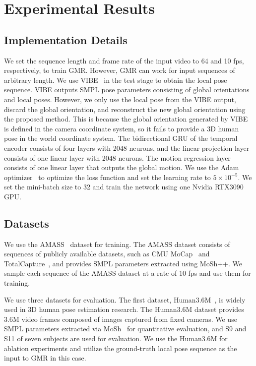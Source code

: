 \documentclass[10pt,twocolumn,letterpaper]{article}
\begin{document}
\section{Experimental Results}

\subsection{Implementation Details}

We set the sequence length and frame rate of the input video to 64 and 10 fps, respectively, to train GMR. However, GMR can work for input sequences of arbitrary length. We use VIBE~\cite{kocabas2020vibe} in the test stage to obtain the local pose sequence. VIBE outputs SMPL pose parameters consisting of global orientations and local poses. However, we only use the local pose from the VIBE output, discard the global orientation, and reconstruct the new global orientation using the proposed method. This is because the global orientation generated by VIBE is defined in the camera coordinate system, so it fails to provide a 3D human pose in the world coordinate system. The bidirectional GRU of the temporal encoder consists of four layers with 2048 neurons, and the linear projection layer consists of one linear layer with 2048 neurons. The motion regression layer consists of one linear layer that outputs the global motion. We use the Adam optimizer~\cite{kingma2014adam} to optimize the loss function and set the learning rate to $5\times{10}^{-5}$. We set the mini-batch size to 32 and train the network using one Nvidia RTX3090 GPU.


\subsection{Datasets}
\label{subsection: datasets}

We use the AMASS~\cite{mahmood2019amass} dataset for training. The AMASS dataset consists of sequences of publicly available datasets, such as CMU MoCap~\cite{de2009guide} and TotalCapture~\cite{trumble2017total}, and provides SMPL parameters extracted using MoSh++. We sample each sequence of the AMASS dataset at a rate of 10 fps and use them for training.

We use three datasets for evaluation. The first dataset, Human3.6M~\cite{ionescu2013human3}, is widely used in 3D human pose estimation research. The Human3.6M dataset provides 3.6M video frames composed of images captured from fixed cameras. We use SMPL parameters extracted via MoSh~\cite{loper2014mosh} for quantitative evaluation, and S9 and S11 of seven subjects are used for evaluation. We use the Human3.6M for ablation experiments and utilize the ground-truth local pose sequence as the input to GMR in this case.
\end{document}
